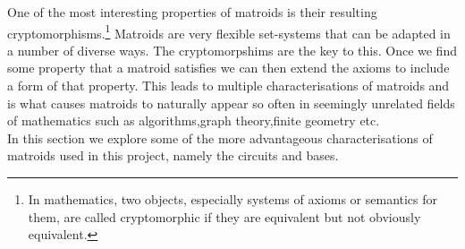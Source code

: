 \documentclass[../main.tex]{subfiles}
\begin{document}
One of the most interesting properties of matroids is their resulting cryptomorphisms.\footnote{In mathematics, two objects, especially systems of axioms or semantics for them, are called cryptomorphic if they are equivalent but not obviously equivalent.\cite{wiki}}
Matroids are very flexible set-systems that can be adapted in a number of diverse ways. The cryptomorpshims are the key to this. Once we find some property that a matroid satisfies we can then extend the axioms to include a form of that property. This leads to multiple characterisations of matroids and is what causes matroids to naturally appear so often in seemingly unrelated fields of mathematics such as algorithms,graph theory,finite geometry etc.\\
In this section we explore some of the more advantageous characterisations of matroids used in this project, namely the circuits and bases.
\end{document}
